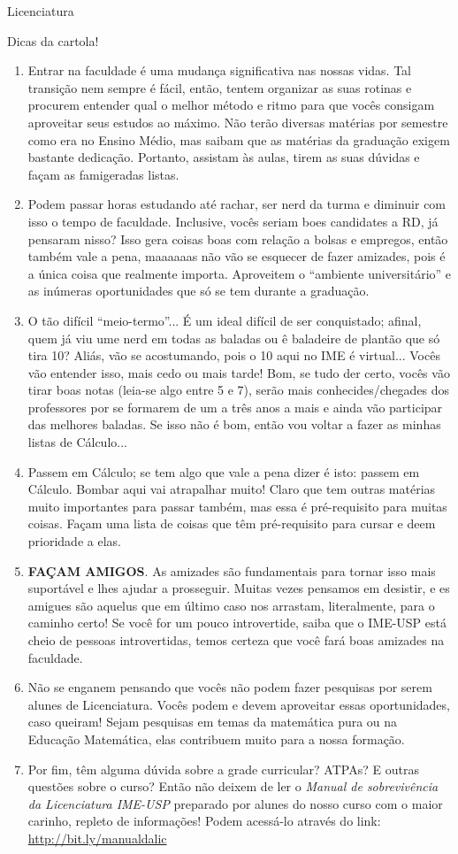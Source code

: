 \begin{subsecao}{Licenciatura}
\begin{subsubsecao}{Dicas da cartola!}
\begin{enumerate}
\item Entrar na faculdade é uma mudança significativa nas nossas vidas. Tal transição
nem sempre é fácil, então, tentem organizar as suas rotinas e procurem entender qual
o melhor método e ritmo para que vocês consigam aproveitar seus estudos ao máximo. Não
terão diversas matérias por semestre como era no Ensino Médio, mas saibam que as matérias
da graduação exigem bastante dedicação. Portanto, assistam às aulas, tirem as suas dúvidas
e façam as famigeradas listas.
\item Podem passar horas estudando até rachar, ser nerd da turma e diminuir com
 isso o tempo de faculdade. Inclusive, vocês seriam boes candidates a RD, já pensaram nisso? 
Isso gera coisas boas com relação a bolsas e empregos, então também vale a pena, 
maaaaaas não vão se esquecer de fazer amizades, pois é a única coisa que realmente importa.
Aproveitem o ``ambiente universitário'' e as inúmeras oportunidades que só se tem durante
a graduação.
\item O tão difícil ``meio-termo''... É um ideal difícil de ser conquistado; afinal,
  quem já viu ume nerd em todas as baladas ou ê baladeire de plantão que só tira
  10? Aliás, vão se acostumando, pois o 10 aqui no IME é virtual... Vocês vão
  entender isso, mais cedo ou mais tarde! Bom, se tudo der certo, vocês vão
  tirar boas notas (leia-se algo entre 5 e 7), serão mais conhecides/chegades
  dos professores por se formarem de um a três anos a mais e ainda
  vão participar das melhores baladas.
  Se isso não é bom, então vou voltar a fazer as minhas listas de Cálculo...
\item Passem em Cálculo; se tem algo que vale a pena dizer é isto: passem em
  Cálculo. Bombar aqui vai atrapalhar muito! Claro que tem outras matérias muito
  importantes para passar também, mas essa é pré-requisito para muitas coisas.
  Façam uma lista de coisas que têm pré-requisito para cursar e deem prioridade
  a elas. 
  \item \textbf{FAÇAM AMIGOS}. As amizades são fundamentais para tornar isso
mais suportável e lhes ajudar a prosseguir. Muitas vezes pensamos em desistir,
 e es amigues são aquelus que em último caso nos arrastam, literalmente, para o caminho certo!
 Se você for um pouco introvertide, saiba que o IME-USP está cheio de pessoas introvertidas, 
 temos certeza que você fará boas amizades na faculdade.
 \item Não se enganem pensando que vocês não podem fazer pesquisas por serem alunes de
 Licenciatura. Vocês podem e devem aproveitar essas oportunidades, caso queiram! Sejam pesquisas
 em temas da matemática pura ou na Educação Matemática, elas contribuem muito para a nossa formação.
 \item Por fim, têm alguma dúvida sobre a grade curricular? ATPAs? E outras questões sobre o curso?
Então não deixem de ler o \textit{Manual de sobrevivência da Licenciatura IME-USP} preparado por alunes
do nosso curso com o maior carinho, repleto de informações! Podem acessá-lo através
do link: \url{http://bit.ly/manualdalic}


\end{enumerate}
\end{subsubsecao}
\end{subsecao}

